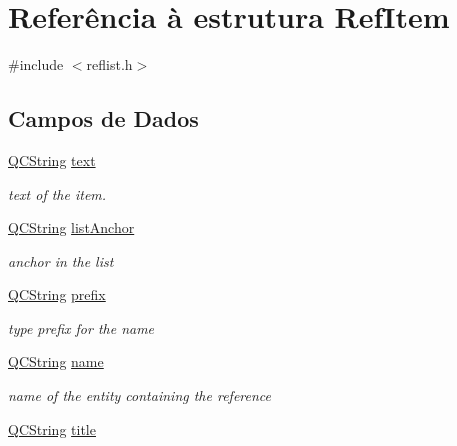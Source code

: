 \hypertarget{struct_ref_item}{\section{Referência à estrutura Ref\-Item}
\label{struct_ref_item}
}


{\ttfamily \#include $<$reflist.\-h$>$}

\subsection*{Campos de Dados}
\begin{DoxyCompactItemize}
\item 
\hypertarget{struct_ref_item_a4699e75142e13e15b0f7c9ada64258c3}{\hyperlink{class_q_c_string}{Q\-C\-String} \hyperlink{struct_ref_item_a4699e75142e13e15b0f7c9ada64258c3}{text}}\label{struct_ref_item_a4699e75142e13e15b0f7c9ada64258c3}

\begin{DoxyCompactList}\small\item\em text of the item. \end{DoxyCompactList}\item 
\hypertarget{struct_ref_item_a80b371aeaa2928cf262034053174bb67}{\hyperlink{class_q_c_string}{Q\-C\-String} \hyperlink{struct_ref_item_a80b371aeaa2928cf262034053174bb67}{list\-Anchor}}\label{struct_ref_item_a80b371aeaa2928cf262034053174bb67}

\begin{DoxyCompactList}\small\item\em anchor in the list \end{DoxyCompactList}\item 
\hypertarget{struct_ref_item_a6eb6cd3fb82f1c723448d136584d8105}{\hyperlink{class_q_c_string}{Q\-C\-String} \hyperlink{struct_ref_item_a6eb6cd3fb82f1c723448d136584d8105}{prefix}}\label{struct_ref_item_a6eb6cd3fb82f1c723448d136584d8105}

\begin{DoxyCompactList}\small\item\em type prefix for the name \end{DoxyCompactList}\item 
\hypertarget{struct_ref_item_adc0097c7bd1e61ad32058fcde425bc7a}{\hyperlink{class_q_c_string}{Q\-C\-String} \hyperlink{struct_ref_item_adc0097c7bd1e61ad32058fcde425bc7a}{name}}\label{struct_ref_item_adc0097c7bd1e61ad32058fcde425bc7a}

\begin{DoxyCompactList}\small\item\em name of the entity containing the reference \end{DoxyCompactList}\item 
\hypertarget{struct_ref_item_a42bb80709d086df855babb087e63794b}{\hyperlink{class_q_c_string}{Q\-C\-String} \hyperlink{struct_ref_item_a42bb80709d086df855babb087e63794b}{title}}\label{struct_ref_item_a42bb80709d086df855babb087e63794b}


\end{DoxyCompactItemize}
